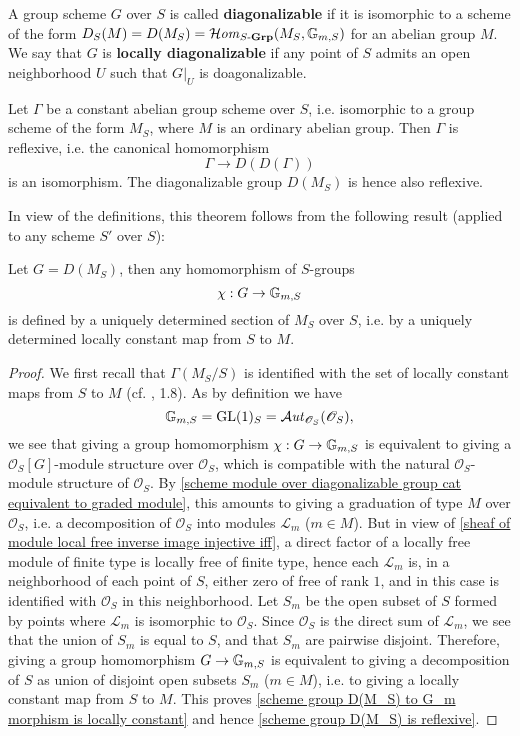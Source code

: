 \begin{definition}
A group scheme $G$ over $S$ is called \textbf{diagonalizable} if it is isomorphic to a scheme of the form $D_S(M)=D(M_S)=\operatorname{\mathcal{H}\hspace*{-0.4pt}\textit{om}\hspace{0.5pt}}_{S\textup{-}\mathbf{Grp}}(M_S,\mathbb{G}_{m,S})$ for an abelian group $M$. We say that $G$ is \textbf{locally diagonalizable} if any point of $S$ admits an open neighborhood $U$ such that $G|_U$ is doagonalizable.
\end{definition}

\begin{theorem}\label{scheme group D(M_S) is reflexive}
Let $\Gamma$ be a constant abelian group scheme over $S$, i.e. isomorphic to a group scheme of the form $M_S$, where $M$ is an ordinary abelian group. Then $\Gamma$ is reflexive, i.e. the canonical homomorphism
\[\Gamma\to D(D(\Gamma))\]
is an isomorphism. The diagonalizable group $D(M_S)$ is hence also reflexive.
\end{theorem}

In view of the definitions, this theorem follows from the following result (applied to any scheme $S'$ over $S$):

\begin{corollary}\label{scheme group D(M_S) to G_m morphism is locally constant}
Let $G=D(M_S)$, then any homomorphism of $S$-groups
\[\chi:G\to\mathbb{G}_{m,S}\]
is defined by a uniquely determined section of $M_S$ over $S$, i.e. by a uniquely determined locally constant map from $S$ to $M$.
\end{corollary}
\begin{proof}
We first recall that $\Gamma(M_S/S)$ is identified with the set of locally constant maps from $S$ to $M$ (cf. \cite{SGA3-1} , 1.8). As by definition we have
\[\mathbb{G}_{m,S}=\mathrm{GL}(1)_S=\operatorname{\mathcal{A}\hspace*{-0.2pt}\textit{ut}\hspace{0.5pt}}_{\mathscr{O}_S}(\mathscr{O}_S),\]
we see that giving a group homomorphism $\chi:G\to\mathbb{G}_{m,S}$ is equivalent to giving a $\mathscr{O}_S[G]$-module structure over $\mathscr{O}_S$, which is compatible with the natural $\mathscr{O}_S$-module structure of $\mathscr{O}_S$. By \cref{scheme module over diagonalizable group cat equivalent to graded module}, this amounts to giving a graduation of type $M$ over $\mathscr{O}_S$, i.e. a decomposition of $\mathscr{O}_S$ into modules $\mathscr{L}_m$ ($m\in M$). But in view of \cref{sheaf of module local free inverse image injective iff}, a direct factor of a locally free module of finite type is locally free of finite type, hence each $\mathscr{L}_m$ is, in a neighborhood of each point of $S$, either zero of free of rank $1$, and in this case is identified with $\mathscr{O}_S$ in this neighborhood. Let $S_m$ be the open subset of $S$ formed by points where $\mathscr{L}_m$ is isomorphic to $\mathscr{O}_S$. Since $\mathscr{O}_S$ is the direct sum of $\mathscr{L}_m$, we see that the union of $S_m$ is equal to $S$, and that $S_m$ are pairwise disjoint. Therefore, giving a group homomorphism $G\to\mathbb{G}_{m,S}$ is equivalent to giving a decomposition of $S$ as union of disjoint open subsets $S_m$ ($m\in M$), i.e. to giving a locally constant map from $S$ to $M$. This proves \cref{scheme group D(M_S) to G_m morphism is locally constant} and hence \cref{scheme group D(M_S) is reflexive}.
\end{proof}

